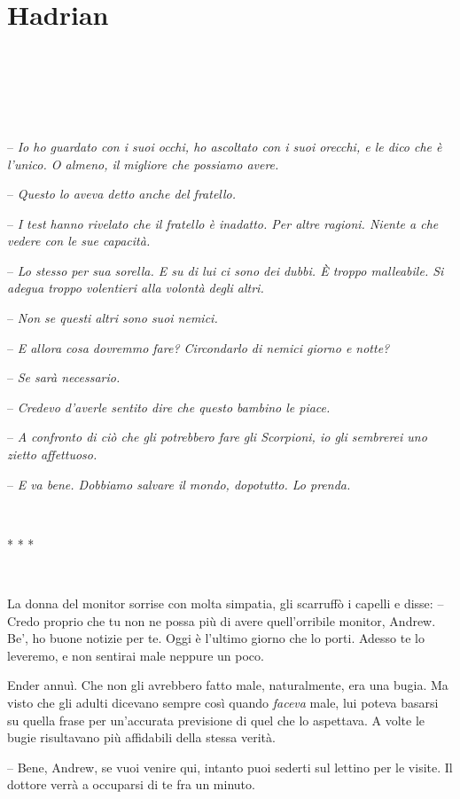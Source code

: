 \mainmatter

\chapter{Hadrian}

{~}

{~}

{~}

{-- \emph{Io ho guardato con i suoi occhi, ho ascoltato con i suoi
		orecchi, e le dico che è l'unico. O almeno, il migliore che possiamo
		avere.}}

{-- \emph{Questo lo aveva detto anche del fratello.}}

{-- \emph{I test hanno rivelato che il fratello è inadatto. Per altre
		ragioni. Niente a che vedere con le sue capacità.}}

{-- \emph{Lo stesso per sua sorella. E su di lui ci sono dei dubbi. È
		troppo malleabile. Si adegua troppo volentieri alla volontà degli
		altri.}}

{-- \emph{Non se questi altri sono suoi nemici.}}

{-- \emph{E allora cosa dovremmo fare? Circondarlo di nemici giorno e
		notte?}}

{-- \emph{Se sarà necessario.}}

{-- \emph{Credevo d'averle sentito dire che questo bambino le piace.}}

{-- \emph{A confronto di ciò che gli potrebbero fare gli Scorpioni, io
		gli sembrerei uno zietto affettuoso.}}

{-- \emph{E va bene. Dobbiamo salvare il mondo, dopotutto. Lo prenda.}}

{~}

{* * *}

{~}

{La donna del monitor sorrise con molta simpatia, gli scarruffò i
	capelli e disse: -- Credo proprio che tu non ne possa più di avere
	quell'orribile monitor, Andrew. Be', ho buone notizie per te. Oggi è
	l'ultimo giorno che lo porti. Adesso te lo leveremo, e non sentirai male
	neppure un poco.}

{Ender annuì. Che non gli avrebbero fatto male, naturalmente, era una
	bugia. Ma visto che gli adulti dicevano sempre così quando \emph{faceva}
	male, lui poteva basarsi su quella frase per un'accurata previsione di
	quel che lo aspettava. A volte le bugie risultavano più affidabili della
	stessa verità.}

{-- Bene, Andrew, se vuoi venire qui, intanto puoi sederti sul lettino
	per le visite. Il dottore verrà a occuparsi di te fra un minuto.}

